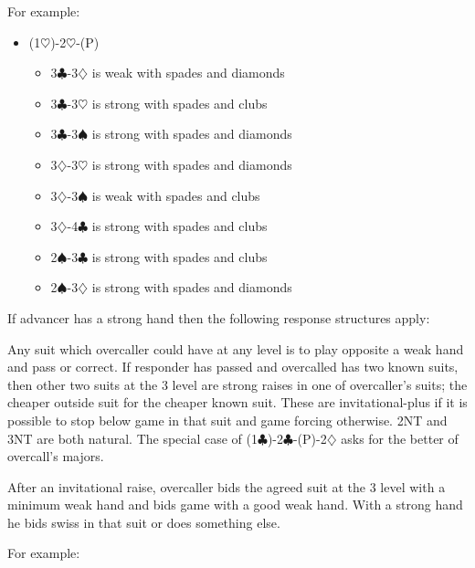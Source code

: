 \documentclass[a4paper,14pt]{extarticle}
\begin{document}
For example:
\begin{itemize}
\item (1$\heartsuit$)-2$\heartsuit$-(P)
	\begin{itemize}
	\item 3$\clubsuit$-3$\diamondsuit$ is weak with spades and diamonds
	\item 3$\clubsuit$-3$\heartsuit$ is strong with spades and clubs
	\item 3$\clubsuit$-3$\spadesuit$ is strong with spades and diamonds
	\item 3$\diamondsuit$-3$\heartsuit$ is strong with spades and diamonds
	\item 3$\diamondsuit$-3$\spadesuit$ is weak with spades and clubs
	\item 3$\diamondsuit$-4$\clubsuit$ is strong with spades and clubs
	\item 2$\spadesuit$-3$\clubsuit$ is strong with spades and clubs
	\item 2$\spadesuit$-3$\diamondsuit$ is strong with spades and diamonds
	\end{itemize}
\end{itemize}

If advancer has a strong hand then the following response structures apply:

Any suit which overcaller could have at any level is to play opposite a weak
hand and pass or correct. If responder has passed and overcalled has two known
suits, then other two suits at the 3 level are strong raises in one of
overcaller's suits; the cheaper outside suit for the cheaper known suit. These
are invitational-plus if it is possible to stop below game in that suit and
game forcing otherwise. 2NT and 3NT are both natural. The special case of
(1$\clubsuit$)-2$\clubsuit$-(P)-2$\diamondsuit$ asks for the better of
overcall's majors.

After an invitational raise, overcaller bids the agreed suit at the 3 level
with a minimum weak hand and bids game with a good weak hand. With a strong
hand he bids swiss in that suit or does something else.

\newpage

For example:
\end{document}
